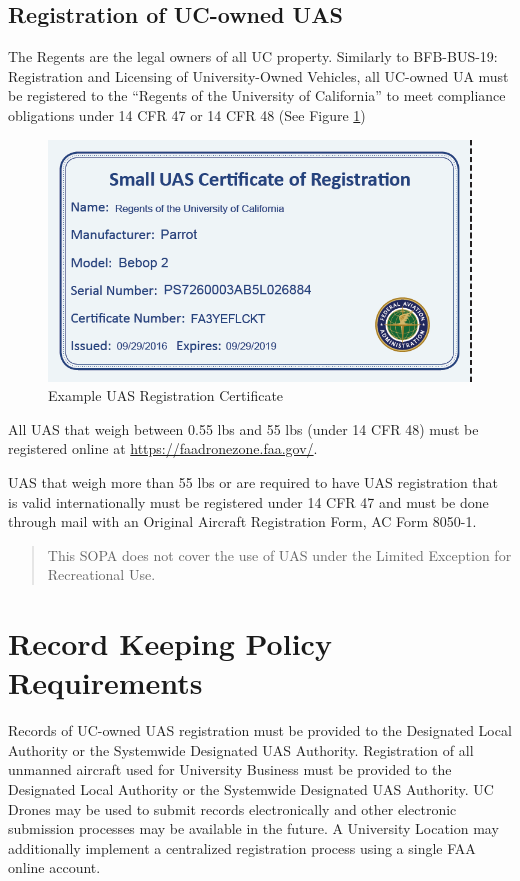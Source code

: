 \documentclass[
]{book}
\begin{document}
\subsection{Registration of UC-owned UAS}\label{registration-of-uc-owned-uas}

The Regents are the legal owners of all UC property. Similarly to BFB-BUS-19: Registration and Licensing of University-Owned Vehicles, all UC-owned UA must be registered to the ``Regents of the University of California'' to meet compliance obligations under 14 CFR 47 or 14 CFR 48 (See Figure \ref{fig:reg-cert})

\begin{figure}

{\centering \includegraphics[width=0.5\linewidth]{images/reg_cert} 

}

\caption{Example UAS Registration Certificate}\label{fig:reg-cert}
\end{figure}

All UAS that weigh between 0.55 lbs and 55 lbs (under 14 CFR 48) must be registered online at \url{https://faadronezone.faa.gov/}.

UAS that weigh more than 55 lbs or are required to have UAS registration that is valid internationally must be registered under 14 CFR 47 and must be done through mail with an Original Aircraft Registration Form, AC Form 8050-1.

\begin{quote}
This SOPA does not cover the use of UAS under the Limited Exception for Recreational Use.
\end{quote}

\section{Record Keeping Policy Requirements}\label{record-keeping-policy-requirements}

Records of UC-owned UAS registration must be provided to the Designated Local Authority or the Systemwide Designated UAS Authority. Registration of all unmanned aircraft used for University Business must be provided to the Designated Local Authority or the Systemwide Designated UAS Authority. UC Drones may be used to submit records electronically and other electronic submission processes may be available in the future. A University Location may additionally implement a centralized registration process using a single FAA online account.
\end{document}
